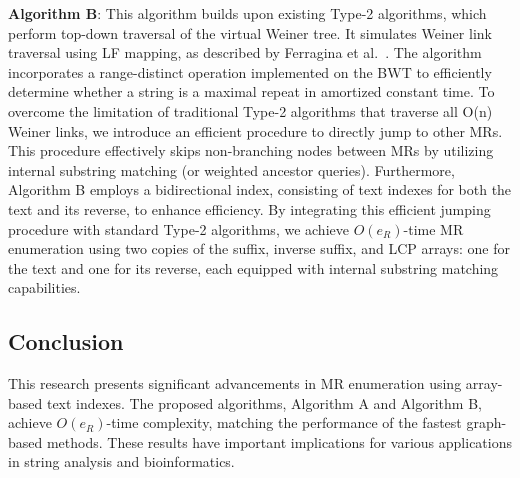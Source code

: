 \textbf{Algorithm B}: 
This algorithm builds upon existing Type-2 algorithms, 
which perform top-down traversal of the virtual Weiner tree. 
It simulates Weiner link traversal using LF mapping, as described by Ferragina et al.~\cite{Ferragina05:FM}.
The algorithm incorporates a range-distinct operation implemented on the BWT to efficiently determine whether a string is a maximal repeat in amortized constant time.
To overcome the limitation of traditional Type-2 algorithms that traverse all O(n) Weiner links, we introduce an efficient procedure to directly jump to other MRs. This procedure effectively skips non-branching nodes between MRs by utilizing internal substring matching (or weighted ancestor queries).
Furthermore, Algorithm B employs a bidirectional index, consisting of text indexes for both the text and its reverse, to enhance efficiency.
By integrating this efficient jumping procedure with standard Type-2 algorithms, we achieve $O(e_R)$-time MR enumeration using two copies of the suffix, inverse suffix, and LCP arrays: one for the text and one for its reverse, each equipped with internal substring matching capabilities.


\subsection{Conclusion}
This research presents significant advancements in MR enumeration using array-based text indexes. The proposed algorithms, Algorithm A and Algorithm B, achieve $O(e_R)$-time complexity, matching the performance of the fastest graph-based methods. These results have important implications for various applications in string analysis and bioinformatics.
